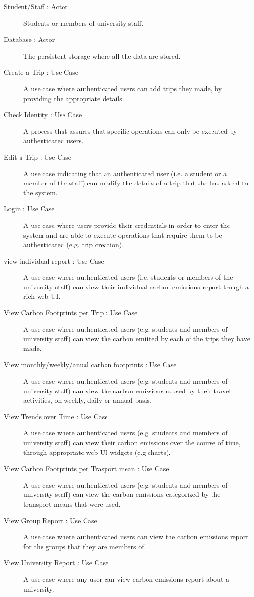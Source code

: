 \begin{description}
  \item[Student/Staff : Actor]
        Students or members of university staff.
  \item[Database : Actor]
        The persistent storage where all the data are stored.
  \item[Create a Trip : Use Case]
        A use case where authenticated users can add trips they made, by providing the appropriate details.
  \item[Check Identity : Use Case]
        A process that assures that specific operations can only be executed by authenticated users.
  \item[Edit a Trip : Use Case]
        A use case indicating that an authenticated user (i.e. a student or a member of the staff) can modify the details of a trip that she has added to the system.
  \item[Login : Use Case]
        A use case where users provide their credentials in order to enter the system and are able to execute operations that require them to be authenticated (e.g. trip creation).
  \item[view individual report : Use Case]
        A use case where authenticated users (i.e. students or members of the university staff) can view their individual carbon emissions report trough a rich web UI.
  \item[View Carbon Footprints per Trip : Use Case]
        A use case where authenticated users (e.g. students and members of university staff) can view the carbon emitted by each of the trips they have made.
  \item[View monthly/weekly/anual carbon footprints : Use Case]
        A use case where authenticated users (e.g. students and members of university staff) can view the carbon emissions caused by their travel activities, on weekly, daily or annual basis.
  \item[View Trends over Time : Use Case]
        A use case where authenticated users (e.g. students and members of university staff) can view their carbon emissions over the course of time, through appropriate web UI widgets (e.g charts).
  \item[View Carbon Footprints per Trasport mean : Use Case]
        A use case where authenticated users (e.g. students and members of university staff) can view the carbon emissions categorized by the transport means that were used.
  \item[View Group Report : Use Case]
        A use case where authenticated users can view the carbon emissions report for the groups that they are members of.
  \item[View University Report : Use Case]
    	A use case where any user can view carbon emissions report about a university.
\end{description}



